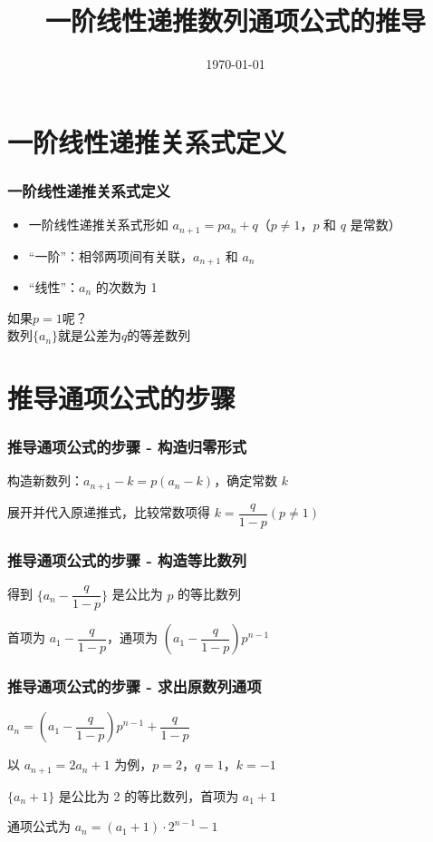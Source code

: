 \documentclass[aspectratio=169]{ctexbeamer} %
\date{\today}
\title{一阶线性递推数列通项公式的推导}
\begin{document}
\begin{frame}
    \frametitle{}
    \titlepage
\end{frame}

\section{一阶线性递推关系式定义}
\begin{frame}
    \frametitle{一阶线性递推关系式定义}
    \begin{itemize}
        \item 一阶线性递推关系式形如 \(a_{n+1}=pa_{n}+q\)（\(p≠1\)，\(p\) 和 \(q\) 是常数）
        \item “一阶”：相邻两项间有关联，\(a_{n+1}\) 和 \(a_{n}\)
        \item “线性”：\(a_{n}\) 的次数为 1
    \end{itemize}
    \alert{如果$p = 1$呢？} \\
    \pause 数列$\{   a_n \}$就是公差为$q$的等差数列
\end{frame}

\section{推导通项公式的步骤}
\begin{frame}
    \frametitle{推导通项公式的步骤 - 构造归零形式}
    构造新数列：\(a_{n+1} -k =p(a_{n}-k)\)，确定常数 \(k\)

    展开并代入原递推式，比较常数项得 \(k = \dfrac{q}{1 -p}(p≠1)\)
\end{frame}

\begin{frame}
    \frametitle{推导通项公式的步骤 - 构造等比数列}
    得到 \(\{a_{n} - \dfrac{q}{1 -p}\}\) 是公比为 \(p\) 的等比数列

    首项为 \(a_{1} - \dfrac{q}{1 -p}\)，通项为 \(\left(a_{1} - \dfrac{q}{1 -p}\right)p^{n -1}\)
\end{frame}

\begin{frame}
    \frametitle{推导通项公式的步骤 - 求出原数列通项}
    \(a_{n} =\left(a_{1} - \dfrac{q}{1 -p}\right)p^{n -1} + \dfrac{q}{1 -p}\)

    以 \(a_{n+1}=2a_{n}+1\) 为例，\(p=2\)，\(q=1\)，\(k=-1\)

    \(\{a_{n}+1\}\) 是公比为 2 的等比数列，首项为 \(a_{1}+1\)

    通项公式为 \(a_{n}=(a_{1}+1)\cdot 2^{n -1} -1\)
\end{frame}
\end{document}
